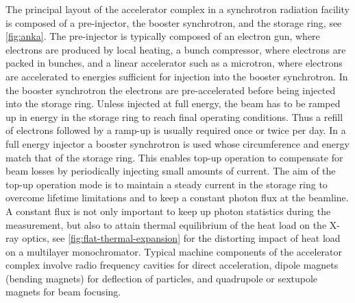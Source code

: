 \documentclass[
twoside,
openright,
titlepage,
numbers=noenddot,
headinclude,
fleqn,
a4paper,
footinclude=true,
cleardoublepage=empty,
abstractoff,
BCOR=5mm,
paper=a4,
fontsize=11pt,
british,ngerman,american,
]{scrreprt}
\begin{document}
The principal layout of the accelerator complex in a synchrotron
radiation facility is composed of a pre-injector, the booster
synchrotron, and the storage ring, see \eg{} \cref{fig:anka}.  The
pre-injector is typically composed of an electron gun, where electrons
are produced by local heating, a bunch compressor, where electrons
are packed in bunches, and a linear accelerator such as a microtron,
where  electrons are accelerated to energies sufficient for
injection into the booster synchrotron.  In the booster synchrotron
the electrons are pre-accelerated before being injected into the
storage ring.  Unless injected at full energy, the beam has to be
ramped up in energy in the storage ring to reach final operating
conditions.  Thus a refill of electrons followed by a ramp-up is
usually required once or twice per day.  In a full energy injector a
booster synchrotron is used whose circumference and energy match that
of the storage ring.  This enables top-up operation to compensate for
beam losses by periodically injecting small amounts of current.  The
aim of the top-up operation mode is to maintain a steady current in
the storage ring to overcome lifetime limitations and to keep a
constant photon flux at the beamline.  A constant flux is not only
important to keep up photon statistics during the measurement, but
also to attain  thermal equilibrium of the heat load on the X-ray
optics, see \cref{fig:flat-thermal-expansion} for the distorting
impact of heat load on a multilayer monochromator.  Typical machine
components of the accelerator complex involve radio frequency cavities
for direct acceleration, dipole magnets (bending magnets) for
deflection of particles, and quadrupole or sextupole magnets for beam
focusing.
\end{document}
